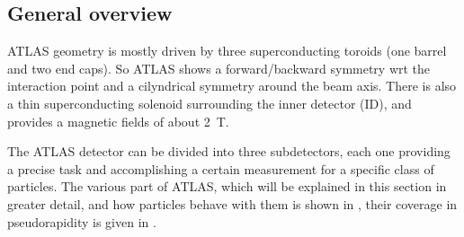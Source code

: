 


\subsection{General overview}
ATLAS geometry is mostly driven by three superconducting toroids (one barrel and two end caps). So ATLAS shows a forward/backward symmetry wrt the interaction point and a cilyndrical symmetry around the beam axis. There is also a thin superconducting solenoid surrounding the inner detector (ID), and provides a magnetic fields of about \SI{2}{\tesla}.

The ATLAS detector can be divided into three subdetectors, each one providing a precise task and accomplishing a certain measurement for a specific class of particles. The various part of ATLAS, which will be explained in this section in greater detail, and how particles behave with them is shown in \Fig{\ref{fig:behaviour}}, their coverage in pseudorapidity is given in \Tab{\ref{tab:eta}}.
